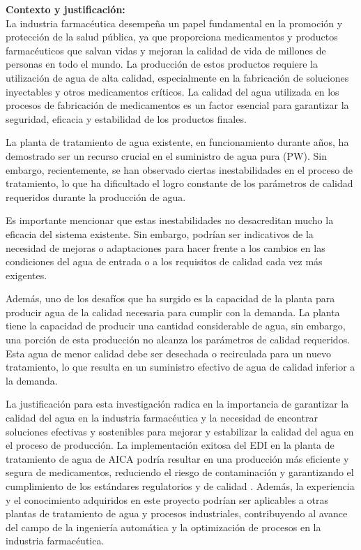 \textbf{Contexto y justificación:}\\
La industria farmacéutica desempeña un papel fundamental en la promoción y protección de la salud pública,
ya que proporciona medicamentos y productos farmacéuticos que salvan vidas y mejoran la calidad de vida
de millones de personas en todo el mundo. La producción de estos productos requiere la utilización de
agua de alta calidad, especialmente en la fabricación de soluciones inyectables y otros medicamentos
críticos. La calidad del agua utilizada en los procesos de fabricación de medicamentos es un factor
esencial para garantizar la seguridad, eficacia y estabilidad de los productos finales.

La planta de tratamiento de agua existente, en funcionamiento durante años,
ha demostrado ser un recurso crucial en el suministro de agua pura (PW).
Sin embargo, recientemente, se han observado ciertas inestabilidades en el
proceso de tratamiento, lo que ha dificultado el logro constante de los parámetros
de calidad requeridos durante la producción de agua.

Es importante mencionar que estas inestabilidades no desacreditan mucho la eficacia
del sistema existente. Sin embargo, podrían ser indicativos de la necesidad
de mejoras o adaptaciones para hacer frente a los cambios en las condiciones
del agua de entrada o a los requisitos de calidad cada vez más exigentes.

Además, uno de los desafíos que ha surgido es la capacidad de la
planta para producir agua de la calidad necesaria para cumplir con la demanda.
La planta tiene la capacidad de producir una cantidad considerable de agua,
sin embargo, una porción de esta producción no alcanza los parámetros de
calidad requeridos. Esta agua de menor calidad debe ser desechada o
recirculada para un nuevo tratamiento, lo que resulta en un suministro
efectivo de agua de calidad inferior a la demanda.

La justificación para esta investigación radica en la importancia de garantizar la calidad del agua
en la industria farmacéutica y la necesidad de encontrar soluciones efectivas y sostenibles para
mejorar y estabilizar la calidad del agua en el proceso de producción. La implementación exitosa
del EDI en la planta de tratamiento de agua de AICA podría resultar en una producción más eficiente
y segura de medicamentos, reduciendo el riesgo de contaminación y garantizando el cumplimiento de los
estándares regulatorios y de calidad \cite{alvaradoElectrodeionizationPrinciplesStrategies2014}. Además, la experiencia y el conocimiento adquiridos en este proyecto
podrían ser aplicables a otras plantas de tratamiento de agua y procesos industriales, contribuyendo al avance
del campo de la ingeniería automática y la optimización de procesos en la industria farmacéutica.

